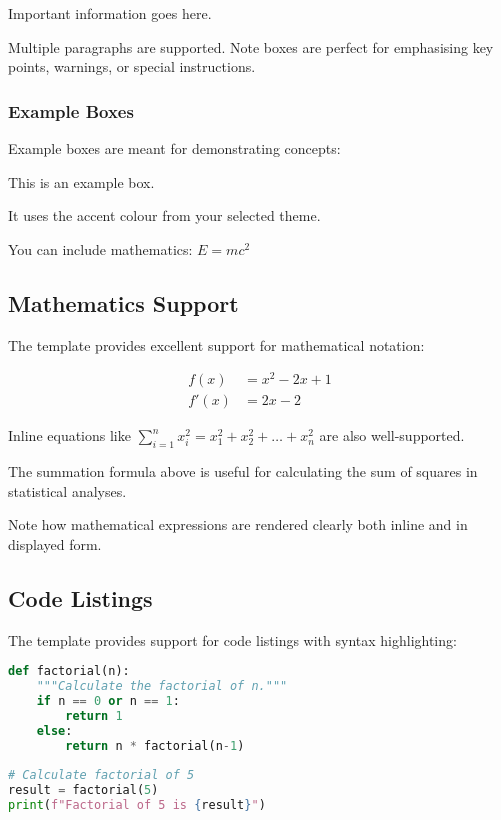 \documentclass[a4paper,11pt]{article}
\begin{document}
\begin{notetbox}
    Important information goes here. 
    
    Multiple paragraphs are supported. Note boxes are perfect for emphasising key points, warnings, or special instructions.
\end{notetbox}

\subsubsection{Example Boxes}
Example boxes are meant for demonstrating concepts:

\begin{exampletbox}
    This is an example box.
    
    It uses the accent colour from your selected theme.
    
    You can include mathematics: $E = mc^2$
\end{exampletbox}

\subsection{Mathematics Support}
The template provides excellent support for mathematical notation:

\begin{align}
    f(x) &= x^2 - 2x + 1 \\
    f'(x) &= 2x - 2
\end{align}

Inline equations like $\sum_{i=1}^n x_i^2 = x_1^2 + x_2^2 + \dots + x_n^2$ are also well-supported.

\begin{notetbox}
    The summation formula above is useful for calculating the sum of squares in statistical analyses.

    Note how mathematical expressions are rendered clearly both inline and in displayed form.
\end{notetbox}

\subsection{Code Listings}
The template provides support for code listings with syntax highlighting:

\begin{lstlisting}[language=Python, caption={Simple Python function}, label={lst:factorial}]
def factorial(n):
    """Calculate the factorial of n."""
    if n == 0 or n == 1:
        return 1
    else:
        return n * factorial(n-1)
        
# Calculate factorial of 5
result = factorial(5)
print(f"Factorial of 5 is {result}")
\end{lstlisting}
\end{document}
